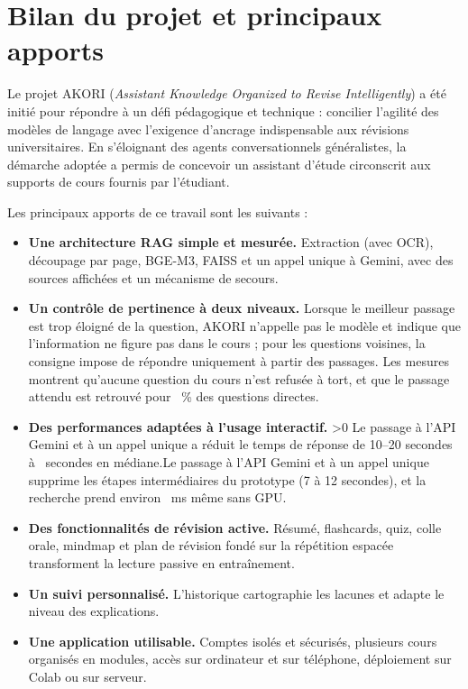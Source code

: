 \documentclass[12pt,a4paper,oneside]{report}
\newcommand{\siGemini}[2]{\ifnum\GemN>0 #1\else #2\fi}
\begin{document}
\section{Bilan du projet et principaux apports}

Le projet AKORI (\emph{Assistant Knowledge Organized to Revise Intelligently}) a été initié pour répondre à un défi pédagogique et technique : concilier l'agilité des modèles de langage avec l'exigence d'ancrage indispensable aux révisions universitaires. En s'éloignant des agents conversationnels généralistes, la démarche adoptée a permis de concevoir un assistant d'étude circonscrit aux supports de cours fournis par l'étudiant.

Les principaux apports de ce travail sont les suivants :
\begin{itemize}
  \item \textbf{Une architecture RAG simple et mesurée.} Extraction (avec OCR), découpage par page, BGE-M3, FAISS et un appel unique à Gemini, avec des sources affichées et un mécanisme de secours.
  \item \textbf{Un contrôle de pertinence à deux niveaux.} Lorsque le meilleur passage est trop éloigné de la question, AKORI n'appelle pas le modèle et indique que l'information ne figure pas dans le cours ; pour les questions voisines, la consigne impose de répondre uniquement à partir des passages. Les mesures montrent qu'aucune question du cours n'est refusée à tort, et que le passage attendu est retrouvé pour \SeuilCoursRappelPct~\% des questions directes.
  \item \textbf{Des performances adaptées à l'usage interactif.} \siGemini{Le passage à l'API Gemini et à un appel unique a réduit le temps de réponse de 10--20 secondes à \GemTotal~secondes en médiane.}{Le passage à l'API Gemini et à un appel unique supprime les étapes intermédiaires du prototype (7 à 12 secondes), et la recherche prend environ \RechMed~ms même sans GPU.}
  \item \textbf{Des fonctionnalités de révision active.} Résumé, flashcards, quiz, colle orale, mindmap et plan de révision fondé sur la répétition espacée transforment la lecture passive en entraînement.
  \item \textbf{Un suivi personnalisé.} L'historique cartographie les lacunes et adapte le niveau des explications.
  \item \textbf{Une application utilisable.} Comptes isolés et sécurisés, plusieurs cours organisés en modules, accès sur ordinateur et sur téléphone, déploiement sur Colab ou sur serveur.
\end{itemize}
\end{document}
